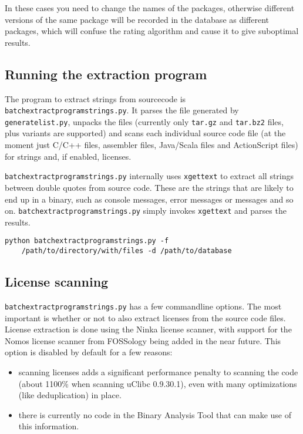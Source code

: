 \documentclass[10pt]{article}
\begin{document}
In these cases you need to change the names of the packages, otherwise
different versions of the same package will be recorded in the database as
different packages, which will confuse the rating algorithm and cause it to
give suboptimal results.


\subsection{Running the extraction program}

The program to extract strings from sourcecode is
\texttt{batchextractprogramstrings.py}. It parses the file generated by
\texttt{generatelist.py}, unpacks the files (currently only \texttt{tar.gz}
and \texttt{tar.bz2} files, plus variants are supported) and scans each
individual source code file (at the moment just C/C++ files, assembler files,
Java/Scala files and ActionScript files) for strings and, if enabled, licenses.

\texttt{batchextractprogramstrings.py} internally uses \texttt{xgettext} to
extract all strings between double quotes from source code. These are the
strings that are likely to end up in a binary, such as console messages, error
messages or messages and so on. \texttt{batchextractprogramstrings.py} simply
invokes \texttt{xgettext} and parses the results.

\begin{verbatim}
python batchextractprogramstrings.py -f
    /path/to/directory/with/files -d /path/to/database
\end{verbatim}

\subsection{License scanning}

\texttt{batchextractprogramstrings.py} has a few commandline options. The most
important is whether or not to also extract licenses from the source code files.
License extraction is done using the Ninka license scanner, with support
for the Nomos license scanner from FOSSology being added in the near future.
This option is disabled by default for a few reasons:

\begin{itemize}
\item scanning licenses adds a significant performance penalty to scanning the
code (about 1100\% when scanning uClibc 0.9.30.1), even with many
optimizations (like deduplication) in place.
\item there is currently no code in the Binary Analysis Tool that can make use
of this information.
\end{itemize}
\end{document}
